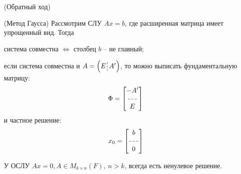 \begin{multicols}{2}
\begin{theorema}{(Обратный ход)}{}
\end{theorema}
\begin{theorema}{(Метод Гаусса)}{}
    Рассмотрим СЛУ $Ax=b$, где расширенная матрица имеет упрощенный вид. Тогда
    \begin{enumerate*}
        \item система совместна $\Longleftrightarrow$ столбец $b$ -- не главный;
        \item если система совместна и $A = \left(E \dashline A'\right)$, то можно выписать фундаментальную матрицу:
        \[
            \Phi = \begin{bmatrix}
                -A'\\
                \rotatebox{90}{\dashline}\\
                E
            \end{bmatrix}
            \]
        и частное решение:
        \[
            x_0 = \begin{bmatrix}
              b \\
              \hdash \\
              0  
            \end{bmatrix}
            \]
    \end{enumerate*}
\end{theorema}
У ОСЛУ $Ax = 0, A\in M_{k\times n}(F), \ n > k$, всегда есть ненулевое решение.

\end{multicols}
